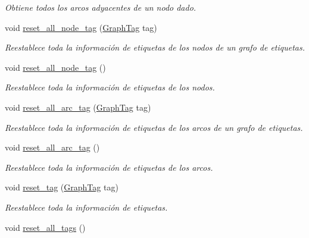 \begin{DoxyCompactItemize}
\begin{DoxyCompactList}\small\item\em Obtiene todos los arcos adyacentes de un nodo dado. \end{DoxyCompactList}\item 
void \hyperlink{class_designar_1_1_base_graph_a07ca1909d77210157b8b9571a4d35d6c}{reset\+\_\+all\+\_\+node\+\_\+tag} (\hyperlink{namespace_designar_ac91366256ea6ea6ac5fd483d55a7499e}{Graph\+Tag} tag)
\begin{DoxyCompactList}\small\item\em Reestablece toda la información de etiquetas de los nodos de un grafo de etiquetas. \end{DoxyCompactList}\item 
void \hyperlink{class_designar_1_1_base_graph_a7bffa4f055b15f76d12bd7c40730a3dd}{reset\+\_\+all\+\_\+node\+\_\+tag} ()
\begin{DoxyCompactList}\small\item\em Reestablece toda la información de etiquetas de los nodos. \end{DoxyCompactList}\item 
void \hyperlink{class_designar_1_1_base_graph_ab73705a167e91d0982a9f149b1d7e71b}{reset\+\_\+all\+\_\+arc\+\_\+tag} (\hyperlink{namespace_designar_ac91366256ea6ea6ac5fd483d55a7499e}{Graph\+Tag} tag)
\begin{DoxyCompactList}\small\item\em Reestablece toda la información de etiquetas de los arcos de un grafo de etiquetas. \end{DoxyCompactList}\item 
void \hyperlink{class_designar_1_1_base_graph_af9ae2a4dfd676090de4b4fa04414989c}{reset\+\_\+all\+\_\+arc\+\_\+tag} ()
\begin{DoxyCompactList}\small\item\em Reestablece toda la información de etiquetas de los arcos. \end{DoxyCompactList}\item 
void \hyperlink{class_designar_1_1_base_graph_ae8845b2eb9d33f62684c8e5acc7c91b7}{reset\+\_\+tag} (\hyperlink{namespace_designar_ac91366256ea6ea6ac5fd483d55a7499e}{Graph\+Tag} tag)
\begin{DoxyCompactList}\small\item\em Reestablece toda la información de etiquetas. \end{DoxyCompactList}\item 
void \hyperlink{class_designar_1_1_base_graph_ae62e72668468a2aaa3ddc91246e1ee1c}{reset\+\_\+all\+\_\+tags} ()

\end{DoxyCompactItemize}
